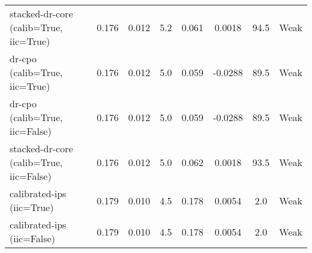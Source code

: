 \begin{table}[htbp]
\begin{tabular}{l|ccccccc}
stacked-dr-core (calib=True, iic=True) & 0.176 & 0.012 & 5.2 & 0.061 & 0.0018 & 94.5 & Weak \\
dr-cpo (calib=True, iic=True) & 0.176 & 0.012 & 5.0 & 0.059 & -0.0288 & 89.5 & Weak \\
dr-cpo (calib=True, iic=False) & 0.176 & 0.012 & 5.0 & 0.059 & -0.0288 & 89.5 & Weak \\
stacked-dr-core (calib=True, iic=False) & 0.176 & 0.012 & 5.0 & 0.062 & 0.0018 & 93.5 & Weak \\
calibrated-ips (iic=True) & 0.179 & 0.010 & 4.5 & 0.178 & 0.0054 & 2.0 & Weak \\
calibrated-ips (iic=False) & 0.179 & 0.010 & 4.5 & 0.178 & 0.0054 & 2.0 & Weak \\
\bottomrule
\end{tabular}
\end{table}